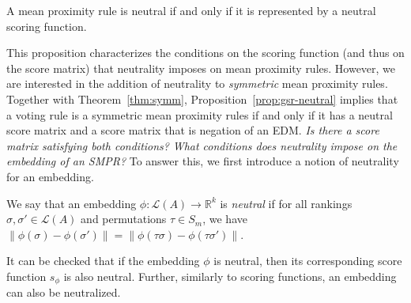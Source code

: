 \documentclass[prodmode,acmec]{ec-acmsmall}
\newcommand{\calL}{{\mathcal{L}}}
\newcommand{\rank}{{\calL(A)}}
\begin{document}
\begin{proposition}
A mean proximity rule is neutral if and only if it is represented by a neutral scoring function.
\label{prop:gsr-neutral}
\end{proposition}
%
This proposition characterizes the conditions on the scoring function (and thus on the score matrix) that neutrality imposes on mean proximity rules. However, we are interested in the addition of neutrality to \emph{symmetric} mean proximity rules. Together with Theorem~\ref{thm:symm}, Proposition~\ref{prop:gsr-neutral} implies that a voting rule is a symmetric mean proximity rules if and only if it has a neutral score matrix and a score matrix that is negation of an EDM. \emph{Is there a score matrix satisfying both conditions?} \emph{What conditions does neutrality impose on the embedding of an SMPR?} To answer this, we first introduce a notion of neutrality for an embedding.



\begin{definition}
We say that an embedding $\phi:\rank \rightarrow \mathbb{R}^k$ is \emph{neutral} if for all rankings $\sigma,\sigma' \in \rank$ and permutations $\tau \in S_m$, we have $\|\phi(\sigma)-\phi(\sigma')\| = \|\phi(\tau \sigma)-\phi(\tau\sigma')\|$.
\end{definition}

It can be checked that if the embedding $\phi$ is neutral, then its corresponding score function $s_{\phi}$ is also neutral. Further, similarly to scoring functions, an embedding can also be neutralized. 
\end{document}
